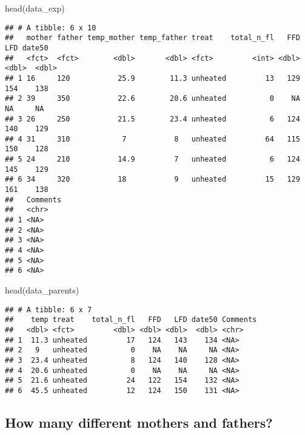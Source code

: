 \documentclass[
]{article}
\newenvironment{Shaded}{\begin{snugshade}}{\end{snugshade}}
\newcommand{\CommentTok}[1]{\textcolor[rgb]{0.56,0.35,0.01}{\textit{#1}}}
\newcommand{\FunctionTok}[1]{\textcolor[rgb]{0.00,0.00,0.00}{#1}}
\newcommand{\NormalTok}[1]{#1}
\newcommand{\SpecialCharTok}[1]{\textcolor[rgb]{0.00,0.00,0.00}{#1}}
\begin{document}
\begin{Shaded}
\begin{Highlighting}[]
\FunctionTok{head}\NormalTok{(data\_exp)}
\end{Highlighting}
\end{Shaded}

\begin{verbatim}
## # A tibble: 6 x 10
##   mother father temp_mother temp_father treat    total_n_fl   FFD   LFD date50
##   <fct>  <fct>        <dbl>       <dbl> <fct>         <int> <dbl> <dbl>  <dbl>
## 1 16     120           25.9        11.3 unheated         13   129   154    138
## 2 39     350           22.6        20.6 unheated          0    NA    NA     NA
## 3 26     250           21.5        23.4 unheated          6   124   140    129
## 4 31     310            7           8   unheated         64   115   150    128
## 5 24     210           14.9         7   unheated          6   124   145    129
## 6 34     320           18           9   unheated         15   129   161    138
##   Comments
##   <chr>   
## 1 <NA>    
## 2 <NA>    
## 3 <NA>    
## 4 <NA>    
## 5 <NA>    
## 6 <NA>
\end{verbatim}

\begin{Shaded}
\begin{Highlighting}[]
\FunctionTok{head}\NormalTok{(data\_parents)}
\end{Highlighting}
\end{Shaded}

\begin{verbatim}
## # A tibble: 6 x 7
##    temp treat    total_n_fl   FFD   LFD date50 Comments
##   <dbl> <fct>         <dbl> <dbl> <dbl>  <dbl> <chr>   
## 1  11.3 unheated         17   124   143    134 <NA>    
## 2   9   unheated          0    NA    NA     NA <NA>    
## 3  23.4 unheated          8   124   140    128 <NA>    
## 4  20.6 unheated          0    NA    NA     NA <NA>    
## 5  21.6 unheated         24   122   154    132 <NA>    
## 6  45.5 unheated         12   124   150    131 <NA>
\end{verbatim}

\hypertarget{how-many-different-mothers-and-fathers}{%
\subsection{How many different mothers and
fathers?}\label{how-many-different-mothers-and-fathers}}

\begin{Shaded}
\end{Shaded}
\end{document}
